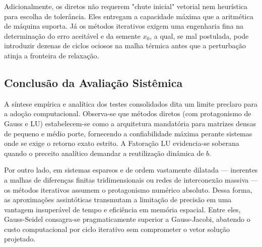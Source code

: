 Adicionalmente, os diretos não requerem "chute inicial" vetorial nem heurística para escolha de tolerância. Eles entregam a capacidade máxima que a aritmética de máquina suporta. Já os métodos iterativos exigem uma engenharia fina na determinação do erro aceitável e da semente $x_0$, a qual, se mal postulada, pode introduzir dezenas de ciclos ociosos na malha térmica antes que a perturbação atinja a fronteira de relaxação.

\subsection{Conclusão da Avaliação Sistêmica}

A síntese empírica e analítica dos testes consolidados dita um limite preclaro para a adoção computacional. Observa-se que métodos diretos (com protagonismo de Gauss e LU) estabelecem-se como a arquitetura mandatória para matrizes densas de pequeno e médio porte, fornecendo a confiabilidade máxima perante sistemas onde se exige o retorno exato estrito. A Fatoração LU evidencia-se soberana quando o preceito analítico demandar a reutilização dinâmica de $b$. 

Por outro lado, em sistemas esparsos e de ordem vastamente dilatada — inerentes a malhas de diferenças finitas tridimensionais ou redes de interconexão massiva — os métodos iterativos assumem o protagonismo numérico absoluto. Dessa forma, as aproximações assintóticas transmutam a limitação de precisão em uma vantagem insuperável de tempo e eficiência em memória espacial. Entre eles, Gauss-Seidel consagra-se pragmaticamente superior a Gauss-Jacobi, abatendo o custo computacional por ciclo iterativo sem comprometer o vetor solução projetado.